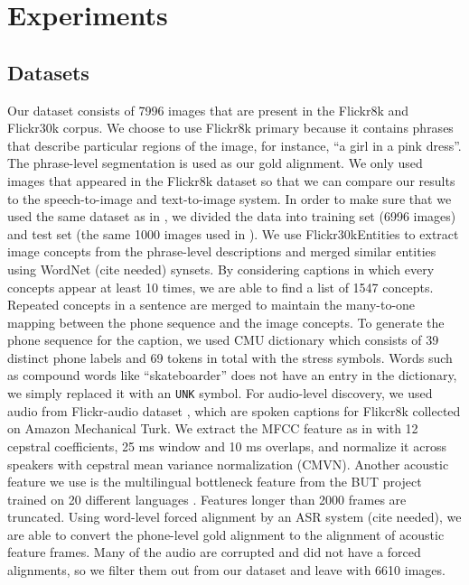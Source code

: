 \documentclass[journal]{IEEEtran}
\begin{document}
\section{Experiments}
\subsection{Datasets}
Our dataset consists of 7996 images that are present in the Flickr8k and Flickr30k corpus. We choose to use Flickr8k primary because it contains phrases that describe particular regions of the image, for instance, ``a girl in a pink dress''. The phrase-level segmentation is used as our gold alignment. We only used images that appeared in the Flickr8k dataset so that we can compare our results to the speech-to-image \cite{Harwath15} and text-to-image \cite{Karpathy15} system. In order to make sure that we used the same dataset as in \cite{Karpathy15, Harwath15}, we divided the data into training set (6996 images) and test set (the same 1000 images used in \cite{Karpathy15, Harwath15}).  We use Flickr30kEntities to extract image concepts from the phrase-level descriptions and merged similar entities using WordNet (cite needed) synsets. By considering captions in which every concepts appear at least 10 times, we are able to find a list of 1547 concepts. Repeated concepts in a sentence are merged to maintain the many-to-one mapping between the phone sequence and the image concepts. To generate the phone sequence for the caption, we used CMU dictionary  which consists of 39 distinct phone labels and 69 tokens in total with the stress symbols. Words such as compound words like ``skateboarder'' does not have an entry in the dictionary, we simply replaced it with an \texttt{UNK} symbol. For audio-level discovery, we used audio from Flickr-audio dataset \cite{Harwath15}, which are spoken captions for Flikcr8k collected on Amazon Mechanical Turk. We extract the MFCC feature as in \cite{Rasanen2015, Kamper2016} with 12 cepstral coefficients, 25 ms window and 10 ms overlaps, and normalize it across speakers with cepstral mean variance normalization (CMVN). Another acoustic feature we use is the multilingual bottleneck feature from the BUT project  trained on 20 different languages \cite{Fer2017}. Features longer than 2000 frames are truncated. Using word-level forced alignment by an ASR system (cite needed), we are able to convert the phone-level gold alignment to the alignment of acoustic feature frames. Many of the audio are corrupted and did not have a forced alignments, so we filter them out from our dataset and leave with 6610 images. 
 
\end{document}
